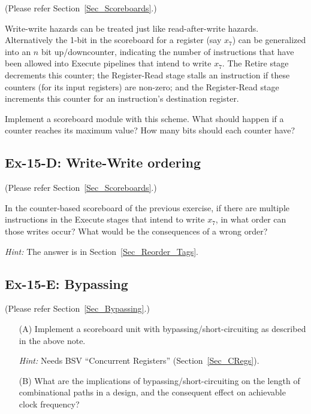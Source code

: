 (Please refer Section~\ref{Sec_Scoreboards}.)

Write-write hazards can be treated just like read-after-write hazards.
Alternatively the 1-bit in the scoreboard for a register (say $x_7$)
can be generalized into an $n$ bit up/downcounter, indicating the
number of instructions that have been allowed into Execute pipelines
that intend to write $x_7$.  The Retire stage decrements this counter;
the Register-Read stage stalls an instruction if these counters (for
its input registers) are non-zero; and the Register-Read stage
increments this counter for an instruction's destination register.

Implement a scoreboard module with this scheme.  What should happen if
a counter reaches its maximum value?  How many bits should each
counter have?


\subsection*{Ex-15-D: Write-Write ordering}
\label{Ex-15-D-Write-Write-ordering}

(Please refer Section~\ref{Sec_Scoreboards}.)

In the counter-based scoreboard of the previous exercise, if there are
multiple instructions in the Execute stages that intend to write
$x_7$, in what order can those writes occur?  What would be the
consequences of a wrong order?

\emph{Hint:} The answer is in Section~\ref{Sec_Reorder_Tags}.


\subsection*{Ex-15-E: Bypassing}
\label{Ex-15-E-Bypassing}

(Please refer Section~\ref{Sec_Bypassing}.)

\begin{itemize}

 \item[(A)] Implement a scoreboard unit with bypassing/short-circuiting as
       described in the above note.

       \emph{Hint:} Needs BSV ``Concurrent Registers'' (Section~\ref{Sec_CRegs}).

 \item[(B)] What are the implications of bypassing/short-circuiting on the
       length of combinational paths in a design, and the consequent
       effect on achievable clock frequency?

\end{itemize}

